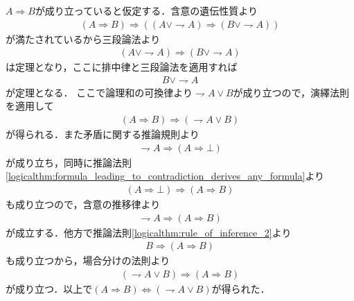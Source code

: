 	\begin{prf}
		$A \Longrightarrow B$が成り立っていると仮定する．含意の遺伝性質より
		\begin{align}
			(A \Longrightarrow B) \Longrightarrow 
			((A \vee \rightharpoondown A) \Longrightarrow (B \vee \rightharpoondown A))
		\end{align}
		が満たされているから三段論法より
		\begin{align}
			(A \vee \rightharpoondown A) \Longrightarrow (B \vee \rightharpoondown A)
		\end{align}
		は定理となり，ここに排中律と三段論法を適用すれば
		\begin{align}
			B \vee \rightharpoondown A
		\end{align}
		が定理となる．
		ここで論理和の可換律より$\rightharpoondown A \vee B$が成り立つので，演繹法則を適用して
		\begin{align}
			(A \Longrightarrow B) \Longrightarrow (\rightharpoondown A \vee B)
		\end{align}
		が得られる．また矛盾に関する推論規則より
		\begin{align}
			\rightharpoondown A \Longrightarrow (A \Longrightarrow \bot)
		\end{align}
		が成り立ち，同時に推論法則\ref{logicalthm:formula_leading_to_contradiction_derives_any_formula}より
		\begin{align}
			(A \Longrightarrow \bot) \Longrightarrow (A \Longrightarrow B)
		\end{align}
		も成り立つので，含意の推移律より
		\begin{align}
			\rightharpoondown A \Longrightarrow (A \Longrightarrow B)
		\end{align}
		が成立する．他方で推論法則\ref{logicalthm:rule_of_inference_2}より
		\begin{align}
			B \Longrightarrow (A \Longrightarrow B)
		\end{align}
		も成り立つから，場合分けの法則より
		\begin{align}
			(\rightharpoondown A \vee B) \Longrightarrow (A \Longrightarrow B)
		\end{align}
		が成り立つ．以上で$(A \Longrightarrow B) \Longleftrightarrow (\rightharpoondown A \vee B)$が得られた．
		\QED
	\end{prf}
	
	

